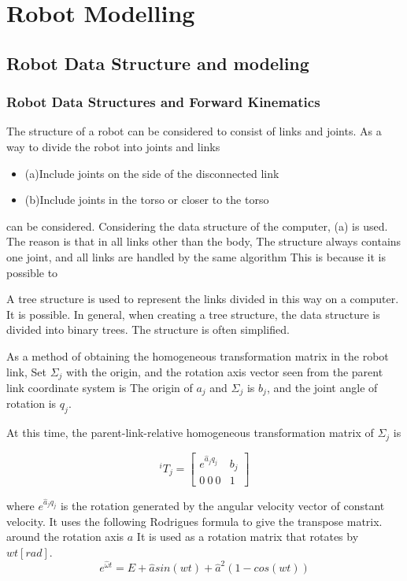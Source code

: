 \section{Robot Modelling}

\subsection{Robot Data Structure and modeling}

\subsubsection{Robot Data Structures and Forward Kinematics}

The structure of a robot can be considered to consist of links and joints.
As a way to divide the robot into joints and links
\begin{itemize}
\item (a)Include joints on the side of the disconnected link
\item (b)Include joints in the torso or closer to the torso
\end{itemize}
can be considered. Considering the data structure of the computer,
(a) is used. The reason is that in all links other than the body,
The structure always contains one joint, and all links are handled by the same algorithm
This is because it is possible to

A tree structure is used to represent the links divided in this way on a computer.
It is possible. In general, when creating a tree structure, the data structure is divided into binary trees.
The structure is often simplified.

As a method of obtaining the homogeneous transformation matrix in the robot link,
Set $\Sigma_j$ with the origin, and the rotation axis vector seen from the parent link coordinate system is
The origin of $a_j$ and $\Sigma_j$ is $b_j$, and the joint angle of rotation is $q_j$.

At this time, the parent-link-relative homogeneous transformation matrix of $\Sigma_j$ is

\[
 {}^iT_j =
 \left[
 \begin{array}{cc}
  e^{\hat{a}_jq_j} & b_j \\
  0~0~0 & 1
 \end{array}
 \right]
\]

where $e^{\hat{a}_jq_j}$ is the rotation generated by the angular velocity vector of constant velocity.
It uses the following Rodrigues formula to give the transpose matrix. around the rotation axis $a$
It is used as a rotation matrix that rotates by $wt[rad]$.
\[
 e^{\hat{\omega}t} = E + \hat{a} sin (wt) + \hat{a}^2 (1 - cos(wt))
\]


